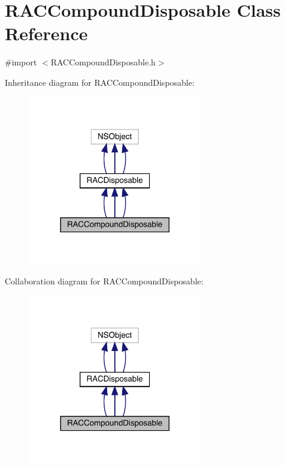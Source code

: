 \hypertarget{interface_r_a_c_compound_disposable}{}\section{R\+A\+C\+Compound\+Disposable Class Reference}
\label{interface_r_a_c_compound_disposable}


{\ttfamily \#import $<$R\+A\+C\+Compound\+Disposable.\+h$>$}



Inheritance diagram for R\+A\+C\+Compound\+Disposable\+:\nopagebreak
\begin{figure}[H]
\begin{center}
\leavevmode
\includegraphics[width=216pt]{interface_r_a_c_compound_disposable__inherit__graph}
\end{center}
\end{figure}


Collaboration diagram for R\+A\+C\+Compound\+Disposable\+:\nopagebreak
\begin{figure}[H]
\begin{center}
\leavevmode
\includegraphics[width=216pt]{interface_r_a_c_compound_disposable__coll__graph}
\end{center}
\end{figure}
